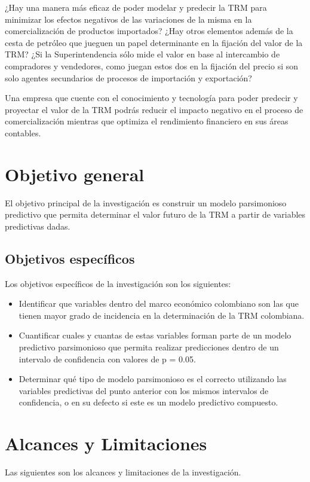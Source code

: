 ¿Hay una manera más eficaz de poder modelar y predecir la TRM para minimizar los efectos negativos de las variaciones de la misma en la comercialización de productos importados? ¿Hay otros elementos además de la cesta de petróleo que jueguen un papel determinante en la fijación del valor de la TRM? ¿Si la Superintendencia sólo mide el valor en base al intercambio de compradores y vendedores, como juegan estos dos en la fijación del precio si son solo agentes secundarios de procesos de importación y exportación?

Una empresa que cuente con el conocimiento y tecnología para poder predecir y proyectar el valor de la TRM podrás reducir el impacto negativo en el proceso de comercialización mientras que optimiza el rendimiento financiero en sus áreas contables.

\section{Objetivo general}
El objetivo principal de la investigación es construir un modelo parsimonioso predictivo que permita determinar el valor futuro de la TRM a partir de variables predictivas dadas.

\subsection{Objetivos específicos}
Los objetivos específicos de la investigación son los siguientes:

\begin{itemize}
	\item Identificar que variables dentro del marco económico colombiano son las que tienen mayor grado de incidencia en la determinación de la TRM colombiana.
	\item Cuantificar cuales y cuantas de estas variables forman parte de un modelo predictivo parsimonioso que permita realizar predicciones dentro de un intervalo de confidencia con valores de p = 0.05.
	\item Determinar qué tipo de modelo parsimonioso es el correcto utilizando las variables predictivas del punto anterior con los mismos intervalos de confidencia, o en su defecto si este es un modelo predictivo compuesto.
\end{itemize}

\section{Alcances y Limitaciones}
Las siguientes son los alcances y limitaciones de la investigación.

